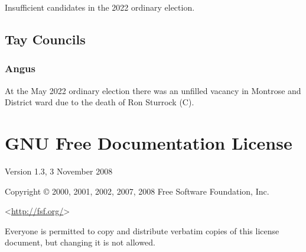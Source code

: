 \documentclass[a4paper,openany]{book}
\begin{document}
\begin{resultsiii}

Insufficient candidates in the 2022 ordinary election.

\section{Tay Councils}

\subsection*{Angus}

At the May 2022 ordinary election there was an unfilled vacancy in Montrose and District ward due to the death of Ron Sturrock (C).%

\end{resultsiii}

\clearpage
{}
{\scriptsize%
\frenchspacing\printindex}
\thispagestyle{plain}

\chapter*{{GNU Free Documentation License}}
\pagestyle{plain}

 Version 1.3, 3 November 2008


 Copyright \copyright{} 2000, 2001, 2002, 2007, 2008 Free Software Foundation, Inc.

 \bigskip

 <\url{http://fsf.org/}>

 \bigskip

 Everyone is permitted to copy and distribute verbatim copies
 of this license document, but changing it is not allowed.
\end{document}
